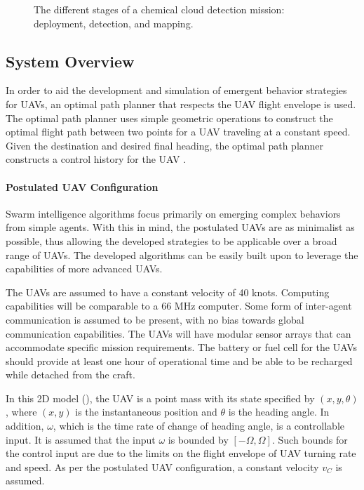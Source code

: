 \begin{figure}[ht]
  \centering
  \begin{minipage}{\linewidth}
    \qquad
    \centering
  \end{minipage}
\caption{The different stages of a chemical cloud detection mission: deployment, detection, and mapping.}
\label{fig:Scenario}
\end{figure}

\subsection{System Overview}

In order to aid the development and simulation of emergent behavior strategies for UAVs, an optimal path planner that respects the UAV flight envelope is used. The optimal path planner uses simple geometric operations to construct the optimal flight path between two points for a UAV traveling at a constant speed. Given the destination and desired final heading, the optimal path planner constructs a control history for the UAV \cite{yang:PathPlanning}. 

\paragraph{Postulated UAV Configuration}

Swarm intelligence algorithms focus primarily on emerging complex behaviors from simple agents. With this in mind, the postulated UAVs are as minimalist as possible, thus allowing the developed strategies to be applicable over a broad range of UAVs. The developed algorithms can be easily built upon to leverage the capabilities of more advanced UAVs. 

The UAVs are assumed to have a constant velocity of 40 knots. Computing capabilities will be comparable to a 66 MHz computer. Some form of inter-agent communication is assumed to be present, with no bias towards global communication capabilities. The UAVs will have modular sensor arrays that can accommodate specific mission requirements. The battery or fuel cell for the UAVs should provide at least one hour of operational time and be able to be recharged while detached from the craft.

In this 2D model (), the UAV is a point mass with its state specified by $(x,y,\theta )$, where $(x,y)$ is the instantaneous position and $\theta $ is the heading angle. In addition, $\omega $, which is the time rate of change of heading angle, is a controllable input. It is assumed that the input $\omega $ is bounded by $[-\Omega ,\Omega ]$. Such bounds for the control input are due to the limits on the flight envelope of UAV turning rate and speed. As per the postulated UAV configuration, a constant velocity $v_C$ is assumed.

